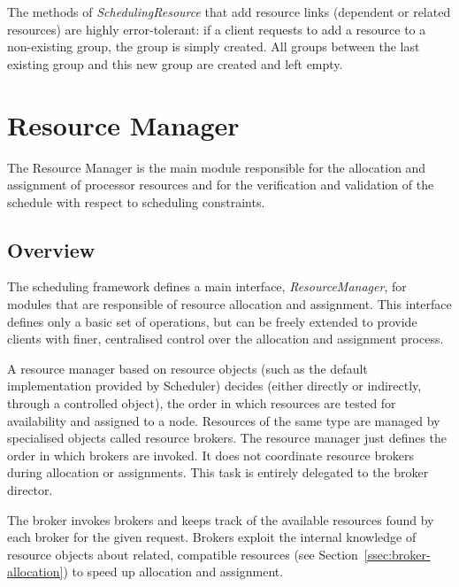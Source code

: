 \documentclass[a4paper,twoside]{tce}
\begin{document}
The methods of \emph{SchedulingResource} that add resource links (dependent
or related resources) are highly error-tolerant: if a client requests to add
a resource to a non-existing group, the group is simply created. All groups
between the last existing group and this new group are created and left
empty.



\chapter{Resource Manager}
\label{ch:ResourceManager}

The Resource Manager is the main module responsible for the allocation and
assignment of processor resources and for the verification and validation of
the schedule with respect to scheduling constraints.

\section{Overview}

The scheduling framework defines a main interface, \emph{ResourceManager},
for modules that are responsible of resource allocation and assignment. This
interface defines only a basic set of operations, but can be freely extended
to provide clients with finer, centralised control over the allocation and
assignment process.

A resource manager based on resource objects (such as the default
implementation provided by Scheduler) decides (either directly or
indirectly, through a controlled object), the order in which resources are
tested for availability and assigned to a node. Resources of the same type
are managed by specialised objects called resource brokers. The resource
manager just defines the order in which brokers are invoked. It does not
coordinate resource brokers during allocation or assignments. This task is
entirely delegated to the broker director.

The broker invokes brokers and keeps track of the available resources found
by each broker for the given request.
%
Brokers exploit the internal knowledge of resource objects about related,
compatible resources (see Section~\ref{ssec:broker-allocation}) to speed up
allocation and assignment.
\end{document}
